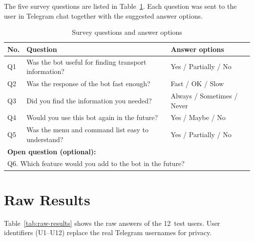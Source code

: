 The five survey questions are listed in
Table~\ref{tab:survey-questions}. Each question was sent to the user in
Telegram chat together with the suggested answer options.

\begin{table}[h]
\centering
\caption{Survey questions and answer options}
\label{tab:survey-questions}
\begin{tabular}{p{}p{}p{}}
\hline
\textbf{No.} & \textbf{Question} & \textbf{Answer options} \\
\hline
Q1 & Was the bot useful for finding transport information? &
Yes / Partially / No \\
Q2 & Was the response of the bot fast enough? &
Fast / OK / Slow \\
Q3 & Did you find the information you needed? &
Always / Sometimes / Never \\
Q4 & Would you use this bot again in the future? &
Yes / Maybe / No \\
Q5 & Was the menu and command list easy to understand? &
Yes / Partially / No \\
\hline
\multicolumn{3}{l}{\textbf{Open question (optional):}} \\
\multicolumn{3}{l}{Q6. Which feature would you add to the bot in the
    future?} \\
\hline
\end{tabular}
\end{table}

\section{Raw Results}
\label{app:results}

Table~\ref{tab:raw-results} shows the raw answers of the 12~test users.
User identifiers (U1--U12) replace the real Telegram usernames for
privacy.

